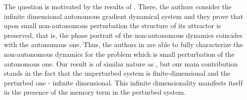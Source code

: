\documentclass[11pt, leqno]{amsart}
\theoremstyle{definition}
\begin{document}
	
	The question is motivated by the results of \cite{borto}. There, the authors consider the infinite dimensional autonomous gradient dynamical system and they prove that upon small non-autonomous perturbation the structure of its attractor is preserved, that is, the phase portrait of the non-autonomous dynamics coincides with the autonomous one. Thus, the authors in \cite{borto} are able to fully characterize the non-autonomous dynamics for the problem which is small perturbation of the autonomous one. 
	 Our result is of similar nature as \cite{borto}, but our main contribution stands in the fact that the unperturbed system is finite-dimensional and the perturbed one - infinite dimensional. This infinite dimensionality manifests itself in the presence of the memory term in the perturbed system.
	
\end{document}
